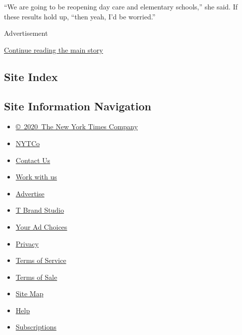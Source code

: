 ``We are going to be reopening day care and elementary schools,'' she
said. If these results hold up, ``then yeah, I'd be worried.''

Advertisement

\protect\hyperlink{after-bottom}{Continue reading the main story}

\hypertarget{site-index}{%
\subsection{Site Index}\label{site-index}}

\hypertarget{site-information-navigation}{%
\subsection{Site Information
Navigation}\label{site-information-navigation}}

\begin{itemize}
\tightlist
\item
  \href{https://help.nytimes.com/hc/en-us/articles/115014792127-Copyright-notice}{©~2020~The
  New York Times Company}
\end{itemize}

\begin{itemize}
\tightlist
\item
  \href{https://www.nytco.com/}{NYTCo}
\item
  \href{https://help.nytimes.com/hc/en-us/articles/115015385887-Contact-Us}{Contact
  Us}
\item
  \href{https://www.nytco.com/careers/}{Work with us}
\item
  \href{https://nytmediakit.com/}{Advertise}
\item
  \href{http://www.tbrandstudio.com/}{T Brand Studio}
\item
  \href{https://www.nytimes.com/privacy/cookie-policy\#how-do-i-manage-trackers}{Your
  Ad Choices}
\item
  \href{https://www.nytimes.com/privacy}{Privacy}
\item
  \href{https://help.nytimes.com/hc/en-us/articles/115014893428-Terms-of-service}{Terms
  of Service}
\item
  \href{https://help.nytimes.com/hc/en-us/articles/115014893968-Terms-of-sale}{Terms
  of Sale}
\item
  \href{https://spiderbites.nytimes.com}{Site Map}
\item
  \href{https://help.nytimes.com/hc/en-us}{Help}
\item
  \href{https://www.nytimes.com/subscription?campaignId=37WXW}{Subscriptions}
\end{itemize}
